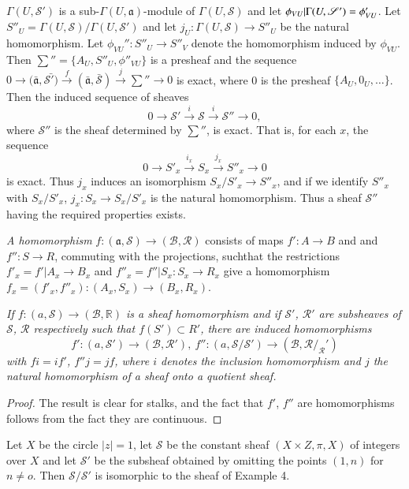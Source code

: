 $\Gamma (U, \mathscr{S}')$ is a sub-$\Gamma (U, \mathfrak{a})$-module
of $\Gamma (U, \mathscr{S})$ and let $\phi_{VU}| \Gamma (U,
\mathscr{S}')\break = \phi'_{VU}$. Let $S''_U = \Gamma (U,\mathscr{S})/ \Gamma (U,
\mathscr{S}')$ and let $j_U : \Gamma (U, \mathscr{S}) \to S''_U$ be
the natural homomorphism. Let $\phi_{VU}'' : S''_U \to S''_V $ denote
the homomorphism induced by $\phi_{VU}$. Then 
$\sum''=\{A_U, S''_U, \phi''_{VU}\}$ is a presheaf and the sequence $0
\to (\bar{\mathfrak{a}}, \bar{\mathscr{S}')}\xrightarrow{f}
(\bar{\mathfrak{a}}, \bar{\mathscr{S}})\xrightarrow{j} \sum'' \to 0$
is exact, where 0 is the presheaf $\{A_U, 0_U, \ldots\}$. Then the
induced sequence of sheaves  
$$
0 \to \mathscr{S}' \xrightarrow{i} \mathscr{S} \xrightarrow{i}
\mathscr{S}'' \to 0, 
$$
where $\mathscr{S}''$ is the sheaf determined by $\sum''$, is
exact. That is, for each $x$, the sequence 
$$
0 \to S'_x \xrightarrow{i_x} S_x \xrightarrow{j_x} S''_x \to 0
$$
is exact. Thus $j_x$ induces an isomorphism $S_x /S'_x \to S''_x$, and
if we identify $S''_x$ with $S_x / S'_x$, $j_x : S_x \to S_x/S'_x$ is
the natural homomorphism. Thus a sheaf $\mathscr{S}''$ having the
required properties exists. 

\begin{defi*}
{\em A homomorphism} $f : (\mathfrak{a},\mathscr{S}) \to (\mathscr{B},
\mathscr{R})$ consists of maps $f' : A \to B$ and  and $f'' : S \to
R$, commuting with the projections, such\pageoriginale that the
restrictions $f'_x = 
f' | A_x \to B_x$ and $f''_x = f'' |S_x: S_x \to R_x$ give a
homomorphism $f_x = (f'_x, f''_x) : (A_x, S_x) \to (B_x, R_x)$. 
\end{defi*}

\textit{If $f : (a, \mathscr{S}) \to (\mathcal{B}, \mathbb{R})$ is a
  sheaf homomorphism and if $\mathscr{S}'$, $\mathscr{R}'$ are subsheaves
  of $\mathscr{S}$, $\mathscr{R}$ respectively such that $f(S') \subset
  R'$, there are induced homomorphisms 
$$
f' : (a, \mathscr{S}') \to (\mathscr{B}, \mathscr{R}'),~f'' : (a,
\mathscr{S}/\mathscr{S}') \to (\mathscr{B}, \mathscr{R}/_\mathscr{R}') 
$$
with $f i = i f'$, $f'' j = jf$, where $i$ denotes the inclusion
homomorphism and $j$ the natural homomorphism of a sheaf onto a
quotient sheaf.} 

\begin{proof}
The result is clear for stalks, and the fact that $f'$, $f''$ are
homomorphisms follows from the fact they are continuous. 
\end{proof}

\begin{exam}%
Let $X$ be the circle $|z|=1$, let $\mathscr{S}$ be the constant sheaf
$(X \times Z, \pi, X)$ of integers over $X$ and let $\mathscr{S}'$ be
the subsheaf obtained by omitting the points $(1, n)$ for $n \neq
o$. Then $\mathscr{S}/\mathscr{S}'$ is isomorphic to the sheaf of
Example 4. 
\end{exam}

